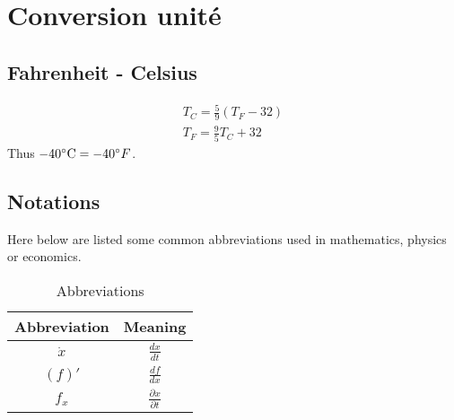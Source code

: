 \chapter{Conversion unité}
\section{Fahrenheit - Celsius}
\begin{eqnarray}
	T_C=\frac{5}{9}(T_F-32)\\
	T_F=\frac{9}{5}T_C+32
\end{eqnarray}
Thus $-40\celsius=-40\degree F$.

\section{Notations}
Here below are listed some common abbreviations used in mathematics, physics or economics.


\begin{table}[h!]
	\centering
	\begin{tabular}{|c|c|}
		\hline 
		\textbf{Abbreviation}&\textbf{Meaning}\\
		\hline
	    \hline
		$\dot x$ &  $\frac{dx}{dt}$\\ 
		\hline
		$(f)'$ &  $\frac{df}{dx}$\\ 
		\hline
		$f_x$ &  $\frac{\partial x}{\partial t}$\\ 
		\hline
	 \end{tabular}	
	\caption{Abbreviations}
	\label{table:abbreviations}
\end{table}

